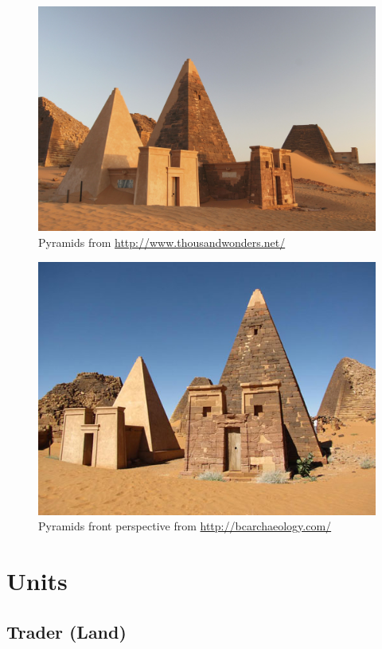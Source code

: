 \documentclass[a4paper,12pt]{scrreprt}
\begin{document}
\begin{figure}[H]
	\centering
	\includegraphics[width=\textwidth]{img/wonder/nubian_pyramids_original}
	\caption{Pyramids from \url{http://www.thousandwonders.net/}}
\end{figure}

\begin{figure}[H]
	\centering
	\includegraphics[width=\textwidth]{img/wonder/meroe-pyramids}
	\caption{Pyramids front perspective from \url{http://bcarchaeology.com/}}
\end{figure}

\section{Units}

\subsection{Trader (Land)}
\end{document}
